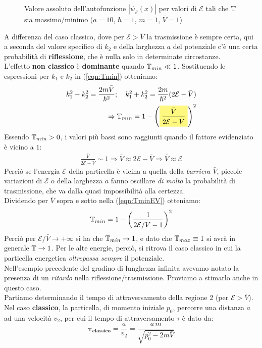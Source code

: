 \documentclass[../../FisicaTeorica.tex]{subfiles}
\begin{document}
\begin{figure}[H]
\centering

\caption{Valore assoluto dell'autofunzione $|\psi_{\mathcal{E}}(x)|$ per valori di $\mathcal{E}$ tali che $\mathbb{T}$ sia massimo/minimo ($a=10$, $\hbar=1$, $m=1$, $\bar{V}=1$)}
\label{plot:TEsuV}
\end{figure}
A differenza del caso classico, dove per $\mathcal{E}>\bar{V}$ la trasmissione è sempre certa, qui a seconda del valore specifico di $k_2$ e della larghezza $a$ del potenziale c'è una certa probabilità di \textbf{riflessione}, che è nulla solo in determinate circostanze.\\
L'effetto \textbf{non classico} è \textbf{dominante} quando $\mathbb{T}_{min}\ll 1$. Sostituendo le espressioni per $k_1$ e $k_2$ in (\ref{eqn:Tmin}) otteniamo:
\begin{align}
k_1^2-k_2^2 = \frac{2m\bar{V}}{\hbar^2}; \quad k_1^2+k_2^2 = \frac{2m}{\hbar^2}(2\mathcal{E}-\bar{V})
\nonumber
\\
\Rightarrow \bb{T}_{min}= 1-\left(\hlc{Yellow}{\frac{\bar{V}}{2\mathcal{E}-\bar{V}}}\right)^2
\label{eqn:TminEV}
\end{align}
Essendo $\mathbb{T}_{min}>0$, i valori più bassi sono raggiunti quando il fattore evidenziato è vicino a $1$:
\begin{align*}
\frac{\bar{V}}{2\mathcal{E}-\bar{V}}\sim 1\Rightarrow \bar{V}\approx 2\mathcal{E}-\bar{V}\Rightarrow \bar{V}\approx \mathcal{E}
\end{align*}
Perciò se l'energia $\mathcal{E}$ della particella è vicina a quella della \textit{barriera} $\bar{V}$, piccole variazioni di $\mathcal{E}$ o della larghezza $a$ fanno oscillare \textit{di molto} la probabilità di trasmissione, che va dalla quasi impossibilità alla certezza.\\
Dividendo per $\bar{V}$ sopra e sotto nella (\ref{eqn:TminEV}) otteniamo:
\[
\mathbb{T}_{min} = 1-\left(\frac{1}{2\mathcal{E}/\bar{V}-1}\right)^2
\]
Perciò per $\mathcal{E}/\bar{V}\to +\infty$ si ha che $\mathbb{T}_{min}\to 1$, e dato che $\mathbb{T}_{max}\equiv 1$ si avrà in generale $\mathbb{T}\to 1$. Per le alte energie, perciò, si ritrova il caso classico in cui la particella energetica \textit{oltrepassa sempre} il potenziale.\\


Nell'esempio precedente del gradino di lunghezza infinita avevamo notato la presenza di un \textit{ritardo} nella riflessione/trasmissione. Proviamo a stimarlo anche in questo caso.\\
Partiamo determinando il tempo di attraversamento della regione 2 (per $\mathcal{E}>\bar{V}$). Nel caso \textbf{classico}, la particella, di momento iniziale $p_0$, percorre una distanza $a$ ad una velocità $v_2$, per cui il tempo di attraversamento $\tau$ è dato da:
\begin{equation}
\bm{\tau_{classico}}=\frac{a}{v_2}=\frac{a\,m}{\sqrt{p_0^2-2m\bar{V}}}
\label{eqn:ritardo_classico_rettangolare}
\end{equation}
 
\end{document}
